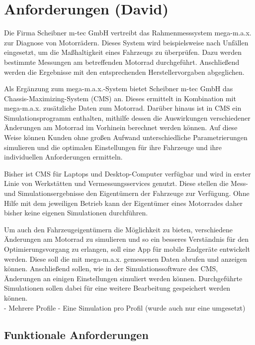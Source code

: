 \chapter{Anforderungen (David)}
\label{chap:anf}
	
	Die Firma Scheibner m-tec GmbH vertreibt das Rahmenmesssystem mega-m.a.x. zur Diagnose von Motorrädern. Dieses System wird beispielsweise nach Unfällen eingesetzt, um die Maßhaltigkeit eines Fahrzeugs zu überprüfen. Dazu werden bestimmte Messungen am betreffenden Motorrad durchgeführt. Anschließend werden die Ergebnisse mit den entsprechenden Herstellervorgaben abgeglichen.
	
	Als Ergänzung zum mega-m.a.x.-System bietet Scheibner m-tec GmbH das Chassis-Maximizing-System (CMS) an. Dieses ermittelt in Kombination mit mega-m.a.x. zusätzliche Daten zum Motorrad. Darüber hinaus ist in CMS ein Simulationsprogramm enthalten, mithilfe dessen die Auswirkungen verschiedener Änderungen am Motorrad im Vorhinein berechnet werden können. Auf diese Weise können Kunden ohne großen Aufwand unterschiedliche Parametrierungen simulieren und die optimalen Einstellungen für ihre Fahrzeuge und ihre individuellen Anforderungen ermitteln.
	
	Bisher ist CMS für Laptops und Desktop-Computer verfügbar und wird in erster Linie von Werkstätten und Vermessungsservices genutzt. Diese stellen die Mess- und Simulationsergebnisse den Eigentümern der Fahrzeuge zur Verfügung. Ohne Hilfe mit dem jeweiligen Betrieb kann der Eigentümer eines Motorrades daher bisher keine eigenen Simulationen durchführen.
	
	Um auch den Fahrzeugeigentümern die Möglichkeit zu bieten, verschiedene Änderungen am Motorrad zu simulieren und so ein besseres Verständnis für den Optimierungsvorgang zu erlangen, soll eine App für mobile Endgeräte entwickelt werden. Diese soll die mit mega-m.a.x. gemessenen Daten abrufen und anzeigen können. Anschließend sollen, wie in der Simulationssoftware des CMS, Änderungen an einigen Einstellungen simuliert werden können. Durchgeführte Simulationen sollen dabei für eine weitere Bearbeitung gespeichert werden können.\\


	- Mehrere Profile
	- Eine Simulation pro Profil (wurde auch nur eine umgesetzt)

	\section{Funktionale Anforderungen}
	\label{sec:funktionale-anf}
	

